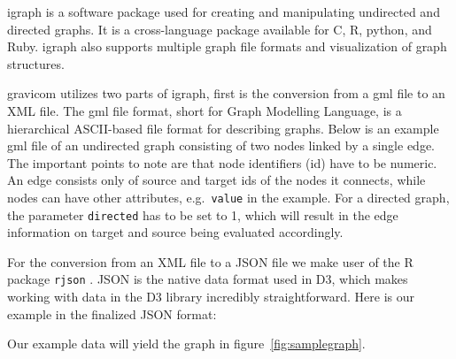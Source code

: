 \documentclass{article}\usepackage[]{graphicx}\usepackage[]{color}
\makeatletter
\newenvironment{kframe}{%
 \def\at@end@of@kframe{}%
 \ifinner\ifhmode%
  \def\at@end@of@kframe{\end{minipage}}%
  \begin{minipage}{\columnwidth}%
 \fi\fi%
 \def\FrameCommand##1{\hskip\@totalleftmargin \hskip-\fboxsep
 \colorbox{shadecolor}{##1}\hskip-\fboxsep
     \hskip-\linewidth \hskip-\@totalleftmargin \hskip\columnwidth}%
 \MakeFramed {\advance\hsize-\width
   \@totalleftmargin\z@ \linewidth\hsize
   \@setminipage}}%
 {\par\unskip\endMakeFramed%
 \at@end@of@kframe}
\newenvironment{knitrout}{}{} %
\makeatother
\begin{document}
igraph \cite{gc-igraph} is a software package used for creating and manipulating undirected and directed graphs. It is a cross-language package available for C, R, python, and Ruby. igraph also supports multiple graph file formats and visualization of graph structures.

gravicom utilizes two parts of igraph, first is the conversion from a gml file to an XML file. The gml file format, short for Graph Modelling Language, is a hierarchical ASCII-based file format for describing graphs. Below is an example gml file of an undirected graph consisting of two nodes linked by a single edge. The important points to note are that  node identifiers (id) have to be numeric. An edge consists only of source and target ids of the nodes it connects, while  nodes can have other attributes, e.g.~{\tt value} in the example. For a directed graph, the parameter {\tt directed} has to be set to 1, which will result in the edge information on target and source being evaluated accordingly.
\begin{knitrout}
\color{fgcolor}\begin{kframe}


{\ttfamily\noindent\color{warningcolor}{\#\# Warning: cannot open file '../data/sample.gml': No such file or directory}}

{\ttfamily\noindent\bfseries\color{errorcolor}{\#\# Error: cannot open the connection}}\end{kframe}
\end{knitrout}

For the conversion from an  XML file  to a JSON file we make user of the R package {\tt rjson} \cite{acb-rjson}.  JSON is the native data format used in D3, which  makes working with data in the D3 library incredibly straightforward. Here is our example in the finalized JSON format:
\begin{knitrout}
\color{fgcolor}\begin{kframe}


{\ttfamily\noindent\color{warningcolor}{\#\# Warning: cannot open file '../data/sample.json': No such file or directory}}

{\ttfamily\noindent\bfseries\color{errorcolor}{\#\# Error: cannot open the connection}}\end{kframe}
\end{knitrout}

Our example data will yield the graph in figure~\ref{fig:samplegraph}.
\end{document}
